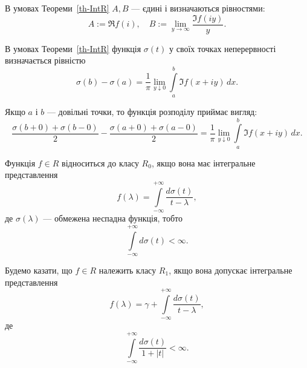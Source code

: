 \begin{remark}
	В умовах Теореми~\ref{th-IntR} $A, B$ --- єдині і визначаються рівностями:
	\begin{equation*}
		A:=\Re f(i),\quad B:=\lim_{y\to \infty} \frac{\Im f(iy)}{y}.
	\end{equation*}
\end{remark}

\begin{theorem} 
	В умовах Теореми~\ref{th-IntR} функція $\sigma(t)$ у своїх точках неперервності визначається рівністю
	\begin{equation} \label{eq-Stil}
		\sigma(b)-\sigma(a)=\frac{1}{\pi} \lim_{y \downarrow 0} \int\limits_a^b \Im f(x+iy)\,dx.
	\end{equation}
\end{theorem}

\begin{remark}
	Якщо $a$ і $b$ --- довільні точки, то функція розподілу приймає вигляд:
	\begin{equation*}
		\frac{\sigma(b+0)+\sigma(b-0)}{2} - \frac{\sigma(a+0)+\sigma(a-0)}{2} = \frac{1}{\pi} \lim_{y \downarrow 0} \int\limits_a^b \Im f(x+iy)\,dx.
	\end{equation*}
\end{remark}

\begin{definition}
	Функція $f\in R$ відноситься до класу $R_0$, якщо вона має інтегральне представлення 
	\begin{equation} \label{eq-R0}
		f(\lambda) = \int\limits_{-\infty}^{+\infty} \frac{d\sigma(t)}{t-\lambda},
	\end{equation} 
	де $\sigma(\lambda)$ --- обмежена неспадна функція, тобто
	\begin{equation} \label{eq-R0-sigma}
		\int\limits_{-\infty}^{+\infty} d\sigma(t)<\infty.
	\end{equation}
\end{definition}

\begin{definition}
	Будемо казати, що $f\in R$ належить класу $R_1$, якщо вона допускає інтегральне представлення
	\begin{equation} \label{eq-R1}
		f(\lambda) = \gamma + \int\limits_{-\infty}^{+\infty} \frac{d\sigma(t)}{t-\lambda},
	\end{equation}
	де
	\begin{equation} \label{eq-R1-sigma}
		\int\limits_{-\infty}^{+\infty} \frac{d\sigma(t)}{1+|t|}<\infty.
	\end{equation}
\end{definition}


